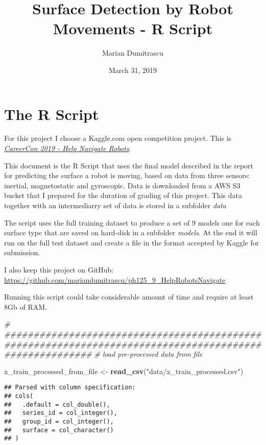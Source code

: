 \documentclass[]{article}
\title{Surface Detection by Robot Movements - R Script}
\author{Marian Dumitrascu}
\date{March 31, 2019}
\newenvironment{Shaded}{\begin{snugshade}}{\end{snugshade}}
\newcommand{\CommentTok}[1]{\textcolor[rgb]{0.56,0.35,0.01}{\textit{#1}}}
\newcommand{\KeywordTok}[1]{\textcolor[rgb]{0.13,0.29,0.53}{\textbf{#1}}}
\newcommand{\NormalTok}[1]{#1}
\newcommand{\StringTok}[1]{\textcolor[rgb]{0.31,0.60,0.02}{#1}}
\begin{document}
\maketitle

\hypertarget{the-r-script}{%
\section{The R Script}\label{the-r-script}}

For this project I choose a Kaggle.com open competition project. This is
\href{https://www.kaggle.com/c/career-con-2019}{\emph{CareerCon 2019 -
Help Navigate Robots}}.

This document is the R Script that uses the final model described in the
report for predicting the surface a robot is moving, based on data from
three sensors: inertial, magnetostatic and gyroscopic. Data is
downloaded from a AWS S3 bucket that I prepared for the duration of
grading of this project. This data together with an intermediarry set of
data is stored in a subfolder \emph{data}

The script uses the full training dataset to produce a set of 9 models
one for each surface type that are saved on hard-disk in a subfolder
\emph{models}. At the end it will run on the full test dataset and
create a file in the format accepted by Kaggle for submission.

I also keep this project on GitHub:
\url{https://github.com/mariandumitrascu/ph125_9_HelpRobotsNavigate}

Running this script could take considerable amount of time and require
at least 8Gb of RAM.

\begin{Shaded}
\begin{Highlighting}[]
\CommentTok{# #######################################################################################################}
\CommentTok{# load pre-processed data from file}

\NormalTok{x_train_processed_from_file <-}\StringTok{ }\KeywordTok{read_csv}\NormalTok{(}\StringTok{"data/x_train_processed.csv"}\NormalTok{)}
\end{Highlighting}
\end{Shaded}

\begin{verbatim}
## Parsed with column specification:
## cols(
##   .default = col_double(),
##   series_id = col_integer(),
##   group_id = col_integer(),
##   surface = col_character()
## )
\end{verbatim}
\end{document}
